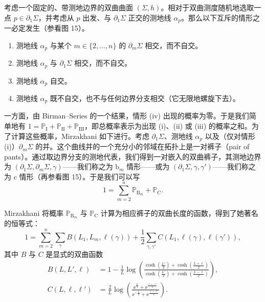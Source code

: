 考虑一个固定的、带测地边界的双曲曲面 $(\Sigma,h)$。相对于双曲测度随机地选取一点 $p\in\partial_1\Sigma$，并考虑从 $p$ 出发、与 $\partial_1\Sigma$ 正交的测地线 $\alpha_p$。那么以下互斥的情形之一必定发生（参看图 15）。
\begin{enumerate}[label=\roman*),leftmargin=2.6em]
  \item 测地线 $\alpha_p$ 与某个 $m\in\{2,\dots,n\}$ 的 $\partial_m\Sigma$ 相交，而不自交。
  \item 测地线 $\alpha_p$ 与 $\partial_1\Sigma$ 相交，而不自交。
  \item 测地线 $\alpha_p$ 自交。
  \item 测地线 $\alpha_p$ 既不自交，也不与任何边界分支相交（它无限地螺旋下去）。
\end{enumerate}

一方面，由 Birman--Series 的一个结果，情形 (iv) 出现的概率为零。于是我们简单地有 $1=\mathbb{P}_{\mathrm{I}}+\mathbb{P}_{\mathrm{II}}+\mathbb{P}_{\mathrm{III}}$，即总概率表示为出现 (i)、(ii) 或 (iii) 的概率之和。为了计算这些概率，Mirzakhani 如下进行。考虑 $\partial_1\Sigma$、测地线 $\alpha_p$ 以及（仅对情形 (i)）$\partial_m\Sigma$ 的并。这个曲线并的一个充分小的邻域在拓扑上是一对裤子（pair of pants）。通过取边界分支的测地代表，我们得到一对嵌入的双曲裤子，其测地边界为 $(\partial_1\Sigma,\partial_m\Sigma,\gamma)$——我们称之为 $\mathrm{b}_m$ 情形——或为 $(\partial_1\Sigma,\gamma,\gamma')$——我们称之为 $\mathrm{c}$ 情形（再参看图 15）。于是我们可以写
\begin{equation}
  1=\sum_{m=2}^n\mathbb{P}_{\mathrm{B}_m}+\mathbb{P}_{\mathrm{C}}.
  \tag{4.9}
\end{equation}

Mirzakhani 将概率 $\mathbb{P}_{\mathrm{B}_m}$ 与 $\mathbb{P}_{\mathrm{C}}$ 计算为相应裤子的双曲长度的函数，得到了她著名的恒等式：
\begin{equation}
  1=\sum_{m=2}^n\sum_\gamma B(L_1,L_m,\ell(\gamma))+\frac12\sum_{\gamma,\gamma'}C(L_1,\ell(\gamma),\ell(\gamma')),
  \tag{4.10}
\end{equation}
其中 $B$ 与 $C$ 是显式的双曲函数
\begin{align}
  B(L,L',\ell)&=1-\frac1L\log\left(\frac{\cosh(\frac{L'}2)+\cosh(\frac{L+\ell}2)}{\cosh(\frac{L'}2)+\cosh(\frac{L-\ell}2)}\right),\nonumber\\
  C(L,\ell,\ell')&=\frac2L\log\left(\frac{\ee^{\frac L2}+\ee^{\frac{\ell+\ell'}2}}{\ee^{-\frac L2}+\ee^{\frac{\ell+\ell'}2}}\right).
  \tag{4.11}
\end{align}

